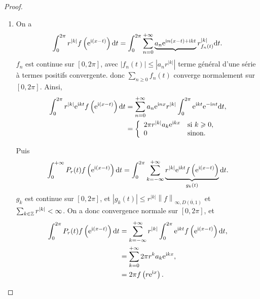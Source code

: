 \documentclass[12pt]{article}
\begin{document}
\begin{proof}
    \phantom{}
    \begin{enumerate}
        \item On a 
        \begin{equation}
            \int_{0}^{2\pi}r^{\left\lvert k\right\rvert}f\left(\mathrm{e}^{\mathrm{i}(x-t)}\right)\mathrm{d} t=\int_{0}^{2\pi}\sum_{n=0}^{+\infty}\underbrace{a_n\mathrm{e}^{\mathrm{i} n(x-t)+\mathrm{i} kt}}r^{\left\lvert k\right\rvert}_{f_n(t)}\mathrm{d} t.
        \end{equation}
        $f_n$ est continue sur $[0,2\pi]$, avec $\left\lvert f_n(t)\right\rvert\leqslant\left\lvert a_n r^{\left\lvert k\right\rvert}\right\rvert$ terme général d'une série à termes positifs convergente. donc $\sum_{n\geqslant0}f_n(t)$ converge normalement sur $[0,2\pi]$. Ainsi,
        \begin{align}
            \int_{0}^{2\pi}r^{\left\lvert k\right\rvert}\e^{\i kt}f\left(\e^{\i(x-t)}\right)\d t
            &=\sum_{n=0}^{+\infty}a_n\e^{\i nx}r^{\left\lvert k\right\rvert}\int_{0}^{2\pi}\e^{\i kt}\e^{-\i nt}\d t,\\
            &=
            \left\lbrace
                \begin{array}[]{ll}
                    2\pi r^{\left\lvert k\right\rvert}a_{k}\e^{\i kx} &\text{si }k\geqslant0,\\
                    0 &\text{sinon.}
                \end{array}
            \right.
        \end{align}

        Puis 
        \begin{equation}
            \int_{0}^{+\infty}P_r(t)f\left(\mathrm{e}^{\mathrm{i}(x-t)}\right)\mathrm{d} t=\int_{0}^{2\pi}\sum_{k=-\infty}^{+\infty}\underbrace{r^{\left\lvert k\right\rvert}\mathrm{e}^{\mathrm{i} kt}f\left(\mathrm{e}^{\mathrm{i} (x-t)}\right)}_{g_k(t)}\mathrm{d} t.
        \end{equation}
        $g_k$ est continue sur $[0,2\pi]$, et $\left\lvert g_k(t)\right\rvert\leqslant r^{\left\lvert k\right\rvert}\left\lVert f\right\rVert_{\infty,\overline{D(0,1)}}$ et $\sum_{k\in\mathbb{Z}}r^{\left\lvert k\right\rvert}<\infty$. On a donc convergence normale sur $[0,2\pi]$, et 
        \begin{align}
            \int_{0}^{2\pi}P_r(t)f\left(\mathrm{e}^{\mathrm{i}(x-t)}\right)\mathrm{d} t
            &=\sum_{k=-\infty}^{+\infty} r^{\left\lvert k\right\rvert}\int_{0}^{2\pi}\mathrm{e}^{\mathrm{i} kt}f\left(\mathrm{e}^{\mathrm{i}(x-t)}\right)\mathrm{d} t,\\
            &=\sum_{k=0}^{+\infty} 2\pi r^{k}a_k\mathrm{e}^{\mathrm{i} kx},\\
            &=2\pi f\left(r\mathrm{e}^{\mathrm{i} x}\right).
        \end{align}


\end{enumerate}
\end{proof}
\end{document}
